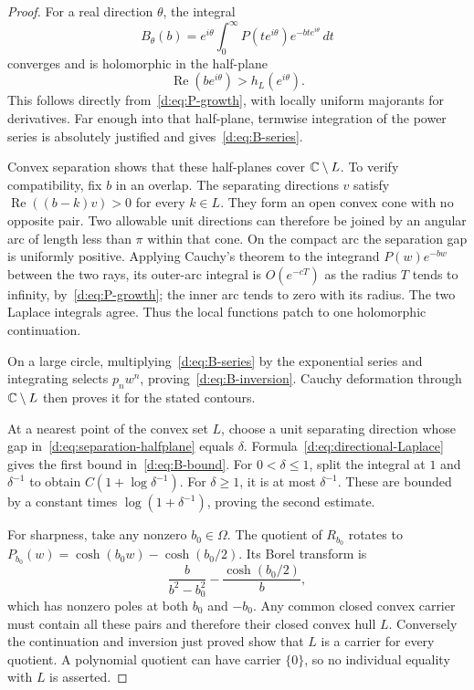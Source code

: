 \documentclass[11pt,a4paper]{article}
\numberwithin{equation}{section}
\theoremstyle{definition}\newtheorem{definition}[theorem]{Definition}
\theoremstyle{remark}\newtheorem{remark}[theorem]{Remark}
\begin{document}
\begin{proof}
For a real direction $\theta$, the integral
\begin{equation}\label{d:eq:directional-Laplace}
 B_\theta(b)=e^{i\theta}\int_0^\infty
     P(te^{i\theta})e^{-bte^{i\theta}}\,dt
\end{equation}
converges and is holomorphic in the half-plane
\begin{equation}\label{d:eq:separation-halfplane}
 \operatorname{Re}(be^{i\theta})>h_L(e^{i\theta}).
\end{equation}
This follows directly from~\eqref{d:eq:P-growth}, with locally uniform majorants for derivatives. Far enough into that half-plane, termwise integration of the power series is absolutely justified and gives~\eqref{d:eq:B-series}.

Convex separation shows that these half-planes cover $\mathbb C\setminus L$. To verify compatibility, fix $b$ in an overlap. The separating directions $v$ satisfy
$\operatorname{Re}((b-k)v)>0$ for every $k\in L$. They form an open convex cone with no opposite pair. Two allowable unit directions can therefore be joined by an angular arc of length less than $\pi$ within that cone. On the compact arc the separation gap is uniformly positive. Applying Cauchy's theorem to the integrand $P(w)e^{-bw}$ between the two rays, its outer-arc integral is $O(e^{-cT})$ as the radius $T$ tends to infinity, by~\eqref{d:eq:P-growth}; the inner arc tends to zero with its radius. The two Laplace integrals agree. Thus the local functions patch to one holomorphic continuation.

On a large circle, multiplying~\eqref{d:eq:B-series} by the exponential series and integrating selects $p_nw^n$, proving~\eqref{d:eq:B-inversion}. Cauchy deformation through $\mathbb C\setminus L$ then proves it for the stated contours.

At a nearest point of the convex set $L$, choose a unit separating direction whose gap in~\eqref{d:eq:separation-halfplane} equals $\delta$. Formula~\eqref{d:eq:directional-Laplace} gives the first bound in~\eqref{d:eq:B-bound}. For $0<\delta\le1$, split the integral at $1$ and $\delta^{-1}$ to obtain $C(1+\log\delta^{-1})$. For $\delta\ge1$, it is at most $\delta^{-1}$. These are bounded by a constant times $\log(1+\delta^{-1})$, proving the second estimate.

For sharpness, take any nonzero $b_0\in\Omega$. The quotient of $R_{b_0}$ rotates to
$P_{b_0}(w)=\cosh(b_0w)-\cosh(b_0/2)$. Its Borel transform is
\[
 \frac{b}{b^2-b_0^2}-\frac{\cosh(b_0/2)}b,
\]
which has nonzero poles at both $b_0$ and $-b_0$. Any common closed convex carrier must contain all these pairs and therefore their closed convex hull $L$. Conversely the continuation and inversion just proved show that $L$ is a carrier for every quotient. A polynomial quotient can have carrier $\{0\}$, so no individual equality with $L$ is asserted.
\end{proof}
\end{document}
